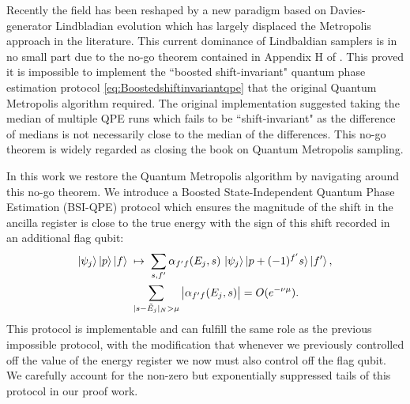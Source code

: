 \documentclass[aps,floatfix,10pt,amssymb,amsfont,amsmath,superscriptaddress,float,nofootinbib,longbibliography,nobalancelastpage,twocolumn]{revtex4-2}
\begin{document}
Recently the field has been reshaped by a new paradigm based on Davies-generator Lindbladian evolution \cite{chen2023quantumthermalstatepreparation,Kastoryano2014QuantumGS,shtanko2021preparing,chen2021fast,chen2023efficient,rall2023thermal,gilyen2024quantum,ding2025efficient,ding2025end,guo2025designing,chen2025efficient, hahn2026efficient, scandi2026thermalization,leng2026accelerating,rouze2026optimal,lloyd2026quantum,Rouz__2026} which has largely displaced the Metropolis approach in the literature. This current dominance of Lindbaldian samplers is in no small part due to the no-go theorem contained in Appendix H of \cite{chen2023quantumthermalstatepreparation}. This proved it is impossible to implement the ``boosted shift-invariant" quantum phase estimation protocol \eqref{eq:Boostedshiftinvariantqpe} that the original Quantum Metropolis algorithm required.  The original implementation \cite{Temme_2011} suggested taking the median of multiple QPE runs which fails to be ``shift-invariant" as the difference of medians is not necessarily close to the median of the differences. This no-go theorem is widely regarded as closing the book on Quantum Metropolis sampling. 

In this work we restore the Quantum Metropolis algorithm by navigating around this no-go theorem. We introduce a Boosted State-Independent Quantum Phase Estimation (BSI-QPE) protocol which ensures the magnitude of the shift in the ancilla register is close to the true energy with the sign of this shift recorded in an additional flag qubit:
\begin{multline}
  \ket{\psi_j}\ket{p}\ket{f} \;\mapsto\; \sum_{s,f'} \alpha_{f'f}(E_j,s)\,
  \ket{\psi_j}\ket{p+(-1)^{f'}s}\ket{f'},\\
  \qquad \sum_{|s-\tilde E_j|_{N} > \mu} \big|\alpha_{f'f}(E_j,s)\big| = O(e^{-\nu\mu}).
\end{multline}
This protocol is implementable and can fulfill the same role as the previous impossible protocol, with the modification that whenever we previously controlled off the value of the energy register we now must also control off the flag qubit. We carefully account for the non-zero but exponentially suppressed tails of this protocol in our proof work.
\end{document}
